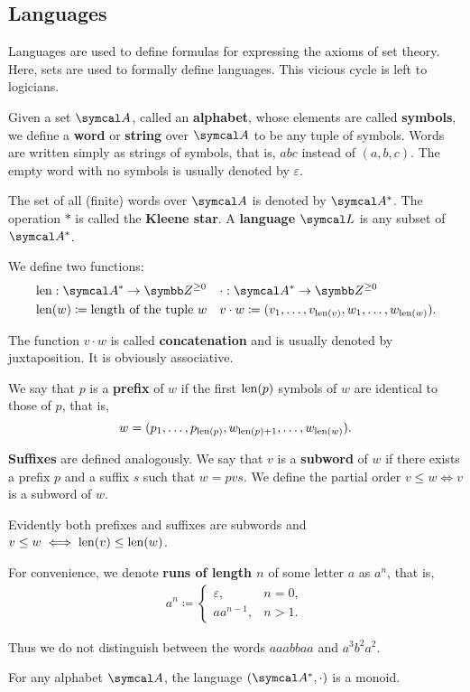 \subsection{Languages}\label{subsec:languages}

Languages are used to define formulas for expressing the axioms of set theory. Here, sets are used to formally define languages. This vicious cycle is left to logicians.

\begin{definition}\label{def:language}
  Given a set \( \Cal{A} \), called an \textbf{alphabet}, whose elements are called \textbf{symbols}, we define a \textbf{word} or \textbf{string} over \( \Cal{A} \) to be any tuple of symbols. Words are written simply as strings of symbols, that is, \( abc \) instead of \( (a, b, c) \). The empty word with no symbols is usually denoted by \( \varepsilon \).

  The set of all (finite) words over \( \Cal{A} \) is denoted by \( \Cal{A}^{*} \). The operation \( * \) is called the \textbf{Kleene star}. A \textbf{language} \( \Cal{L} \) is any subset of \( \Cal{A}^{*} \).

  We define two functions:
  \begin{align*}
    &\Len: \Cal{A}^{*} \to \BB{Z}^{\geq 0}
    &&\cdot: \Cal{A}^{*} \to \BB{Z}^{\geq 0}
    \\
    &\Len(w) \coloneqq \text{length of the tuple } w
    &&v \cdot w \coloneqq (v_1, \ldots, v_{\Len(v)}, w_1, \ldots, w_{\Len(w)}).
  \end{align*}

  The function \( v \cdot w \) is called \textbf{concatenation} and is usually denoted by juxtaposition. It is obviously associative.

  We say that \( p \) is a \textbf{prefix} of \( w \) if the first \( \operatorname{len}(p) \) symbols of \( w \) are identical to those of \( p \), that is,
  \begin{equation*}
    w = (p_1, \ldots, p_{\operatorname{len}(p)}, w_{\operatorname{len}(p) + 1}, \ldots, w_{\operatorname{len}(w)}).
  \end{equation*}

  \textbf{Suffixes} are defined analogously. We say that \( v \) is a \textbf{subword} of \( w \) if there exists a prefix \( p \) and a suffix \( s \) such that \( w = pvs \). We define the partial order \( v \leq w \iff v \) is a subword of \( w \).

  Evidently both prefixes and suffixes are subwords and \( v \leq w \iff \operatorname{len}(v) \leq \operatorname{len}(w) \).

  For convenience, we denote \textbf{runs of length \( n \)} of some letter \( a \) as \( a^n \), that is,
  \begin{align*}
    a^n \coloneqq \begin{cases}
      \varepsilon, &n = 0, \\
      a a^{n-1}, &n > 1.
    \end{cases}
  \end{align*}

  Thus we do not distinguish between the words \( aaabbaa \) and \( a^3 b^2 a^2 \).
\end{definition}

\begin{proposition}\label{thm:set_of_all_words_is_monoid}
  For any alphabet \( \Cal{A} \), the language \( (\Cal{A}^{*}, \cdot) \) is a monoid.
\end{proposition}
